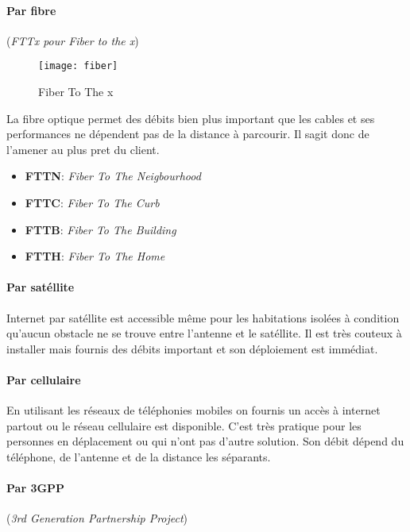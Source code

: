  \paragraph{Par fibre} (\textit{FTTx pour Fiber to the x})\leavevmode

 \smallskip

 \begin{figure}[h]
	 \centering
	 \texttt{[image: fiber]}
	 \caption{Fiber To The x}
 \end{figure}

 La fibre optique permet des débits bien plus important que les cables et ses performances ne dépendent pas de la distance à parcourir. Il sagit donc de l'amener au plus pret du client.
 \begin{itemize}
	 \item \textbf{FTTN}: \textit{Fiber To The Neigbourhood}
	 \item \textbf{FTTC}: \textit{Fiber To The Curb}
	 \item \textbf{FTTB}: \textit{Fiber To The Building}
	 \item \textbf{FTTH}: \textit{Fiber To The Home}
 \end{itemize}


 \paragraph{Par satéllite}\leavevmode

 \smallskip

 Internet par satéllite est accessible même pour les habitations isolées à condition qu'aucun obstacle ne se trouve entre l'antenne et le satéllite. Il est très couteux à installer mais fournis des débits important et son déploiement est immédiat.




 \paragraph{Par cellulaire}\leavevmode

 \smallskip

 En utilisant les réseaux de téléphonies mobiles on fournis un accès à internet partout ou le réseau cellulaire est disponible. C'est très pratique pour les personnes en déplacement ou qui n'ont pas d'autre solution. Son débit dépend du téléphone, de l'antenne et de la distance les séparants.


 \paragraph{Par 3GPP} (\textit{3rd Generation Partnership Project})\leavevmode

